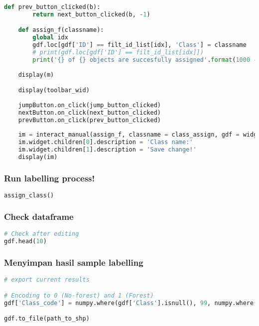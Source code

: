 \begin{lstlisting}[language=Python]
    def prev_button_clicked(b):
        return next_button_clicked(b, -1)

    def assign_f(classname):
        global idx
        gdf.loc[gdf['ID'] == filt_id_list[idx], 'Class'] = classname
        # print(gdf.loc[gdf['ID'] == filt_id_list[idx]])
        print('{} of {} objects are succesfully assigned'.format(1000 - len(gdf[gdf['Class'].isna()]), len(gdf)-1))
    
    display(m)

    display(toolbar_wid)
    
    jumpButton.on_click(jump_button_clicked)
    nextButton.on_click(next_button_clicked)
    prevButton.on_click(prev_button_clicked)
    
    im = interact_manual(assign_f, classname = class_assign, gdf = widgets.fixed(gdf))
    im.widget.children[0].description = 'Class name:'
    im.widget.children[1].description = 'Save change!'
    display(im)
\end{lstlisting}

\hypertarget{run-labelling-process}{%
\subsubsection{Run labelling process!}\label{run-labelling-process}}

\begin{lstlisting}[language=Python]
assign_class()
\end{lstlisting}

\hypertarget{check-dataframe}{%
\subsubsection{Check dataframe}\label{check-dataframe}}

\begin{lstlisting}[language=Python]
# Check after editing
gdf.head(10)
\end{lstlisting}

\hypertarget{menyimpan-hasil-sample-labelling}{%
\subsubsection{Menyimpan hasil sample
labelling}\label{menyimpan-hasil-sample-labelling}}

\begin{lstlisting}[language=Python]
# export current results

# Encoding to 0 (No-forest) and 1 (Forest)
gdf['Class_code'] = numpy.where(gdf['Class'].isnull(), 99, numpy.where(gdf['Class'] == 'Forest', 1, 0))

gdf.to_file(path_to_shp)
\end{lstlisting}

